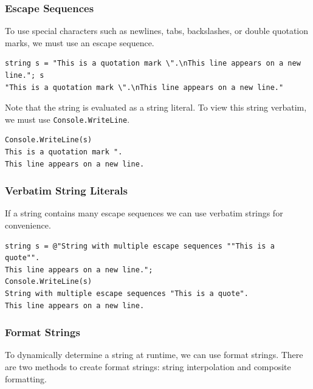 \documentclass{article}
\def\customlinemarker#1#2{
    \edef\thelstnumber{%
        \unexpanded{%
            \ifnum#1=\value{lstnumber}\relax
              #2%
            \fi}%
        \ifx\thelstnumber\relax\else
        \expandafter\unexpanded\expandafter{\thelstnumber}%
        \fi
    }
}
\begin{document}
\subsubsection{Escape Sequences}
To use special characters such as newlines, tabs, backslashes, or double quotation marks, we must
use an escape sequence.
\begingroup
\let\thelstnumber\relax
\customlinemarker{1}{\$}
\begin{lstlisting}
string s = "This is a quotation mark \".\nThis line appears on a new line."; s
"This is a quotation mark \".\nThis line appears on a new line."
\end{lstlisting}
\endgroup
Note that the string is evaluated as a string literal. To view this string verbatim, we must use
\lstinline{Console.WriteLine}.
\begingroup
\let\thelstnumber\relax
\customlinemarker{1}{\$}
\begin{lstlisting}
Console.WriteLine(s) 
This is a quotation mark ".
This line appears on a new line.
\end{lstlisting}
\endgroup
\subsubsection{Verbatim String Literals}
If a string contains many escape sequences we can use verbatim strings for convenience.
\begingroup
\let\thelstnumber\relax
\customlinemarker{1}{\$}
\customlinemarker{3}{\$}
\begin{lstlisting}
string s = @"String with multiple escape sequences ""This is a quote"".
This line appears on a new line.";
Console.WriteLine(s)
String with multiple escape sequences "This is a quote".
This line appears on a new line.
\end{lstlisting}
\endgroup
\subsubsection{Format Strings}
To dynamically determine a string at runtime, we can use format strings.
There are two methods to create format strings: string interpolation and composite formatting.
\end{document}
